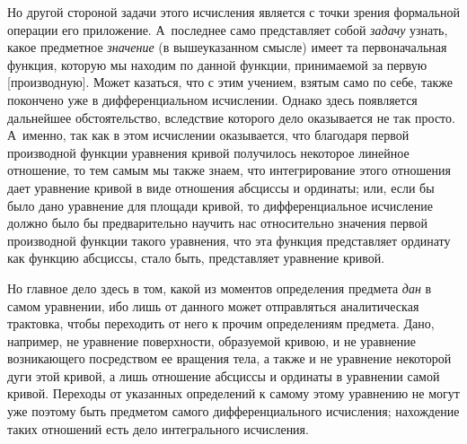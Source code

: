 Но другой стороной задачи этого исчисления является с точки зрения
формальной операции его приложение. А~последнее само представляет собой
{\em задачу} узнать, какое предметное
{\em значение} (в вышеуказанном смысле) имеет та
первоначальная функция, которую мы находим по данной функции, принимаемой
за первую [производную]. Может казаться, что с этим учением, взятым само по
себе, также покончено уже в дифференциальном исчислении. Однако здесь
появляется дальнейшее обстоятельство, вследствие которого дело оказывается
не так просто. А~именно, так как в этом исчислении оказывается, что
благодаря первой производной функции уравнения кривой получилось некоторое
линейное отношение, то тем самым мы также знаем, что интегрирование этого
отношения дает уравнение кривой в виде отношения абсциссы и ординаты; или,
если бы было дано уравнение для площади кривой, то дифференциальное
исчисление должно было бы предварительно научить нас относительно значения
первой производной функции такого уравнения, что эта функция представляет
ординату как функцию абсциссы, стало быть, представляет уравнение кривой.

Но главное дело здесь в том, какой из моментов определения предмета
{\em дан} в самом уравнении, ибо лишь от данного может
отправляться аналитическая трактовка, чтобы переходить от него к прочим
определениям предмета. Дано, например, не уравнение поверхности, образуемой
кривою, и не уравнение возникающего посредством ее вращения тела, а также и
не уравнение некоторой дуги этой кривой, а лишь отношение абсциссы и
ординаты в уравнении самой кривой. Переходы от указанных определений к
самому этому уравнению не могут уже поэтому быть предметом самого
дифференциального исчисления; нахождение таких отношений есть дело
интегрального исчисления.

